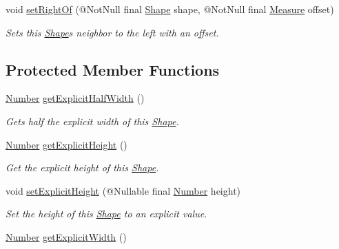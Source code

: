 \begin{DoxyCompactItemize}
void \hyperlink{classcom_1_1aarrelaakso_1_1drawl_1_1_shape_a89e85848d24dca0fa60ff68d169eef11}{set\+Right\+Of} (@Not\+Null final \hyperlink{classcom_1_1aarrelaakso_1_1drawl_1_1_shape}{Shape} shape, @Not\+Null final \hyperlink{classcom_1_1aarrelaakso_1_1drawl_1_1_measure}{Measure} offset)
\begin{DoxyCompactList}\small\item\em Sets this \hyperlink{classcom_1_1aarrelaakso_1_1drawl_1_1_shape}{Shape}\textquotesingle{}s neighbor to the left with an offset. \end{DoxyCompactList}\end{DoxyCompactItemize}
\subsection*{Protected Member Functions}
\begin{DoxyCompactItemize}
\item 
\hyperlink{interfacecom_1_1aarrelaakso_1_1drawl_1_1_number}{Number} \hyperlink{classcom_1_1aarrelaakso_1_1drawl_1_1_shape_a3acdc2fd1944e2efacd0bfbb8aefe89b}{get\+Explicit\+Half\+Width} ()
\begin{DoxyCompactList}\small\item\em Gets half the explicit width of this \hyperlink{classcom_1_1aarrelaakso_1_1drawl_1_1_shape}{Shape}. \end{DoxyCompactList}\item 
\hyperlink{interfacecom_1_1aarrelaakso_1_1drawl_1_1_number}{Number} \hyperlink{classcom_1_1aarrelaakso_1_1drawl_1_1_shape_a48917787cedbfd447cd37edbb59a1145}{get\+Explicit\+Height} ()
\begin{DoxyCompactList}\small\item\em Get the explicit height of this \hyperlink{classcom_1_1aarrelaakso_1_1drawl_1_1_shape}{Shape}. \end{DoxyCompactList}\item 
void \hyperlink{classcom_1_1aarrelaakso_1_1drawl_1_1_shape_a3680a63cef0d766132d1f64813ca8eca}{set\+Explicit\+Height} (@Nullable final \hyperlink{interfacecom_1_1aarrelaakso_1_1drawl_1_1_number}{Number} height)
\begin{DoxyCompactList}\small\item\em Set the height of this \hyperlink{classcom_1_1aarrelaakso_1_1drawl_1_1_shape}{Shape} to an explicit value. \end{DoxyCompactList}\item 
\hyperlink{interfacecom_1_1aarrelaakso_1_1drawl_1_1_number}{Number} \hyperlink{classcom_1_1aarrelaakso_1_1drawl_1_1_shape_aca08f18bbe102a5cf6a77cb746d42875}{get\+Explicit\+Width} ()

\end{DoxyCompactItemize}
